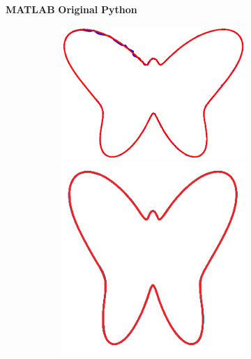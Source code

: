 \begin{figure}

    \centering
    \textbf{MATLAB}\hspace{8em}
    \textbf{Original}\hspace{8em}
    \textbf{Python}
    
    \begin{subfigure}{\textwidth}
        \centering
        
        \textbf{}\begin{subfigure}{\textwidth}
        \centering
    
        \includegraphics[trim=1.5cm 2cm 1.5cm 2cm, clip=true,height=.1\textheight]{Figures/Fig_T1/MATLAB/FORCE_T1_Trajectory_noaxis}
        \hspace{3em}
        \includegraphics[height=.08\textheight]{Figures/Fig_T1/Orig/FORCE_T1_Trajectory}

\end{subfigure}
\end{subfigure}
\end{figure}
